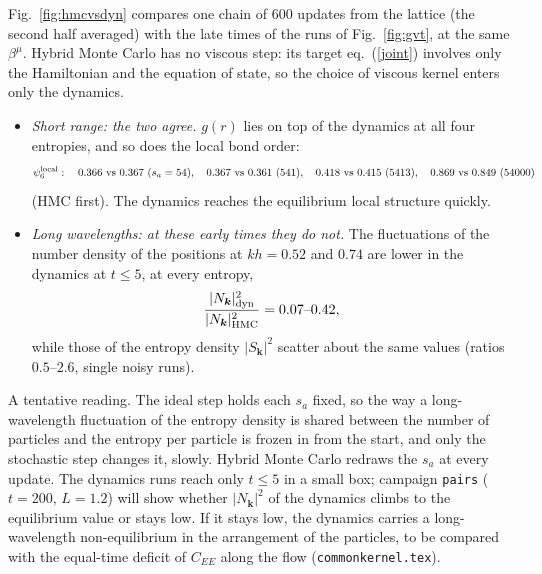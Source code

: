 \documentclass[11pt,aps,preprint,nofootinbib,superscriptaddress,tightenlines]{revtex4-2}
\def\st{\begin{equation}}
\def\stp{\end{equation}}
\def\Eq#1{eq.~(\ref{#1})}
\def\Fig#1{Fig.~\ref{#1}}
\begin{document}
\Fig{fig:hmcvsdyn} compares one chain of $600$ updates from the lattice (the second half averaged) with the late times of the
runs of \Fig{fig:gvt}, at the same $\beta^\mu$.  Hybrid Monte Carlo has no viscous step: its target \Eq{joint} involves only the
Hamiltonian and the equation of state, so the choice of viscous kernel enters only the dynamics.
\begin{itemize}
\item \emph{Short range: the two agree.}  $g(r)$ lies on top of the dynamics at all four entropies, and so does the local bond
  order:
  \st
  \psi_6^{\rm local}:\quad 0.366\ \text{vs}\ 0.367\ (s_a=54),\quad 0.367\ \text{vs}\ 0.361\ (541),\quad 0.418\ \text{vs}\ 0.415\ (5413),\quad 0.869\ \text{vs}\ 0.849\ (54000)
  \stp
  (HMC first).  The dynamics reaches the equilibrium local structure quickly.
\item \emph{Long wavelengths: at these early times they do not.}  The fluctuations of the number density of the positions at
  $kh=0.52$ and $0.74$ are lower in the dynamics at $t\le5$, at every entropy,
  \st
  \frac{|N_{\bm k}|^2_{\rm dyn}}{|N_{\bm k}|^2_{\rm HMC}}=0.07\text{--}0.42 ,
  \stp
  while those of the entropy density $|S_{\bm k}|^2$ scatter about the same values (ratios $0.5$--$2.6$, single noisy runs).
\end{itemize}
A tentative reading.  The ideal step holds each $s_a$ fixed, so the way a long-wavelength fluctuation of the entropy density is
shared between the number of particles and the entropy per particle is frozen in from the start, and only the stochastic step
changes it, slowly.  Hybrid Monte Carlo redraws the $s_a$ at every update.  The dynamics runs reach only $t\le5$ in a small box;
campaign \texttt{pairs} ($t=200$, $L=1.2$) will show whether $|N_{\bm k}|^2$ of the dynamics climbs to the equilibrium value or
stays low.  If it stays low, the dynamics carries a long-wavelength non-equilibrium in the arrangement of the particles, to be
compared with the equal-time deficit of $C_{EE}$ along the flow (\texttt{commonkernel.tex}).
\end{document}
